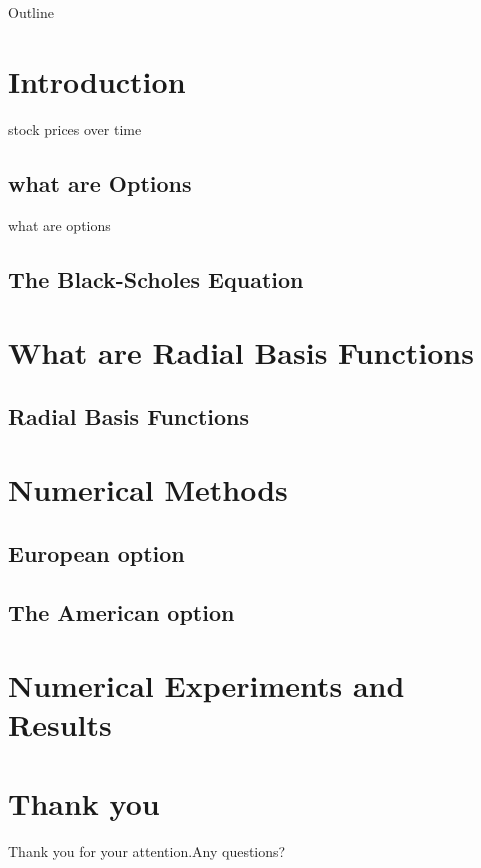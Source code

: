 \documentclass{beamer}
\title[]
\author[Nana Akwasi Abayie Boateng]
{
  \textcolor{green!50!black}{Nana Akwasi Abayie Boateng}\inst{}
}
\institute[MTSU] {
  \inst{}%
  Middle Tennessee State University
}
\date[November 28, 2011]
\begin{document}
\begin{frame}
  \titlepage
\end{frame}

\begin{frame}{Outline}
  \tableofcontents
\end{frame}

\section{Introduction}
\begin{frame}[t]{stock prices over time}

\end{frame}
\subsection{what are Options}
\begin{frame}[t]{what are options}


\end{frame}





\subsection{The Black-Scholes Equation}






\section{What are Radial Basis Functions}
\subsection{Radial Basis Functions}








\section{Numerical Methods}
\subsection{European option}






\subsection{The American option}




\section{Numerical Experiments and Results}





\section{Thank you}
\begin{frame}
Thank you for your attention.Any questions?
\end{frame}
\end{document}
